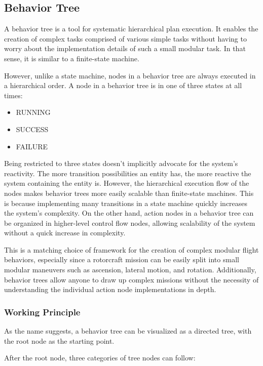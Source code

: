 \subsection{Behavior Tree}\label{subsec:setup:behavior_tree}

A behavior tree is a tool for systematic hierarchical plan execution. It enables the creation of complex tasks comprised of various simple tasks without having to worry about the implementation details of such a small modular task. In that sense, it is similar to a finite-state machine.

However, unlike a state machine, nodes in a behavior tree are always executed in a hierarchical order. A node in a behavior tree is in one of three states at all times: 

\begin{itemize}
    \item RUNNING
    \item SUCCESS
    \item FAILURE
\end{itemize}

Being restricted to three states doesn't implicitly advocate for the system's reactivity. The more transition possibilities an entity has, the more reactive the system containing the entity is. However, the hierarchical execution flow of the nodes makes behavior trees more easily scalable than finite-state machines. This is because implementing many transitions in a state machine quickly increases the system's complexity. On the other hand, action nodes in a behavior tree can be organized in higher-level control flow nodes, allowing scalability of the system without a quick increase in complexity.

This is a matching choice of framework for the creation of complex modular flight behaviors, especially since a rotorcraft mission can be easily split into small modular maneuvers such as ascension, lateral motion, and rotation. Additionally, behavior trees allow anyone to draw up complex missions without the necessity of understanding the individual action node implementations in depth.

\subsubsection{Working Principle}
As the name suggests, a behavior tree can be visualized as a directed tree, with the root node as the starting point. 

After the root node, three categories of tree nodes can follow:

